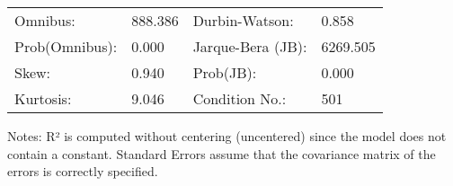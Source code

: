 \begin{table}
\begin{center}
\begin{tabular}{llll}
\hline
Omnibus:       & 888.386 & Durbin-Watson:    & 0.858     \\
Prob(Omnibus): & 0.000   & Jarque-Bera (JB): & 6269.505  \\
Skew:          & 0.940   & Prob(JB):         & 0.000     \\
Kurtosis:      & 9.046   & Condition No.:    & 501       \\
\hline
\end{tabular}
\end{center}
\end{table}
\bigskip
Notes: \newline 
[1] R² is computed without centering (uncentered) since the                 model does not contain a constant. \newline 
[2] Standard Errors assume that the covariance matrix of the errors is correctly specified.
